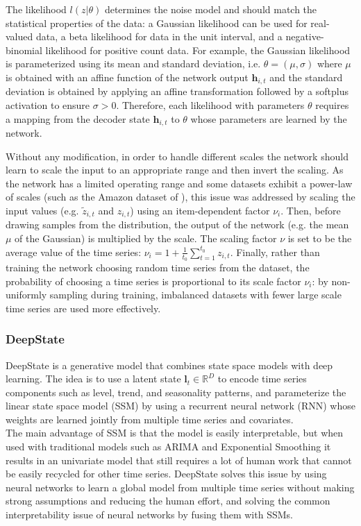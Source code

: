\documentclass[a4paper, 12pt]{article} %
\begin{document}
	The likelihood $l(z | \theta)$ determines the noise model and should match the statistical properties of the data: a Gaussian likelihood can be used for real-valued data, a beta likelihood for data in the unit interval, and a negative-binomial likelihood for positive count data. For example, the Gaussian likelihood is parameterized using its mean and standard deviation, i.e. $\theta = (\mu, \sigma)$ where $\mu$ is obtained with an affine function of the network output $\pmb{h}_{i,t}$ and the standard deviation is obtained by applying an affine transformation followed by a softplus activation to ensure $\sigma > 0$.
	Therefore, each likelihood with parameters $\theta$ requires a mapping from the decoder state $\pmb{h}_{i,t}$ to $\theta$ whose parameters are learned by the network.
	
		Without any modification, in order to handle different scales the network should learn to scale the input to an appropriate range and then invert the scaling. As the network has a limited operating range and some datasets exhibit a power-law of scales (such as the Amazon dataset of \cite{DeepAR}), this issue was addressed by scaling the input values (e.g. $\tilde{z}_{i, t}$ and $z_{i,t}$) using an item-dependent factor $\nu_i$. Then, before drawing samples from the distribution, the output of the network (e.g. the mean $\mu$ of the Gaussian) is multiplied by the scale. The scaling factor $\nu$ is set to be the average value of the time series: $\nu_i = 1 + \frac{1}{t_0} \sum_{t=1}^{t_0} z_{i,t}$. Finally, rather than training the network choosing random time series from the dataset, the probability of choosing a time series is proportional to its scale factor $\nu_i$: by non-uniformly sampling during training, imbalanced datasets with fewer large scale time series are used more effectively.
		
	
	\subsubsection{DeepState } \label{sssec:deepstate}
	DeepState \cite{DeepState} is a generative model that combines state space models \cite{ExponentialSmoothingStateSpace} with deep learning. The idea is to use a latent state $\pmb{l}_t \in \mathbb{R}^D$ to encode time series components such as level, trend, and seasonality patterns, and parameterize the linear state space model (SSM) by using a recurrent neural network (RNN) whose weights are learned jointly from multiple time series and covariates. \\
	The main advantage of SSM is that the model is easily interpretable, but when used with traditional models such as ARIMA and Exponential Smoothing it results in an univariate model that still requires a lot of human work that cannot be easily recycled for other time series.
	DeepState solves this issue by using neural networks to learn a global model from multiple time series without making strong assumptions and reducing the human effort, and solving the common interpretability issue of neural networks by fusing them with SSMs.
	
\end{document}
